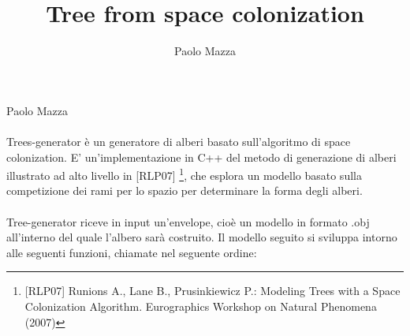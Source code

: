 \documentclass[10pt,a4paper]{report}
\author{Paolo Mazza}
\title{Tree from space colonization}
\begin{document}
Paolo Mazza\qquad \qquad\qquad\qquad\qquad\qquad{}\\\\
Trees-generator è un generatore di alberi basato sull'algoritmo di space colonization. E' un'implementazione in C++ del metodo di generazione di alberi illustrato ad alto livello in [RLP07] \footnote{[RLP07] Runions A., Lane B., Prusinkiewicz P.: Modeling Trees with a Space Colonization Algorithm. Eurographics Workshop on Natural Phenomena (2007)}, che esplora un modello basato sulla competizione dei rami per lo spazio per determinare la forma degli alberi.\\\\
Tree-generator riceve in input un'envelope, cioè un modello in formato .obj all'interno del quale l'albero sarà costruito. Il modello seguito si sviluppa intorno alle seguenti funzioni, chiamate nel seguente ordine:
\end{document}
